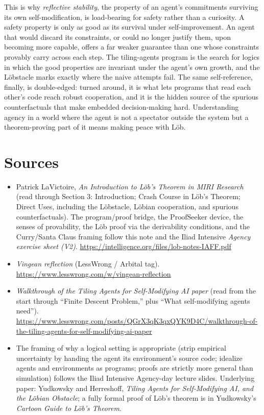 \documentclass[10pt]{article}
\theoremstyle{definition}
\theoremstyle{remark}
\newcommand{\PS}{\mathrm{ProofSeeker}}
\begin{document}
This is why \emph{reflective stability}, the property of an agent's commitments surviving its own self-modification, is load-bearing for safety rather than a curiosity. A safety property is only as good as its survival under self-improvement. An agent that would discard its constraints, or could no longer justify them, upon becoming more capable, offers a far weaker guarantee than one whose constraints provably carry across each step. The tiling-agents program is the search for logics in which the good properties are invariant under the agent's own growth, and the L\"obstacle marks exactly where the naive attempts fail. The same self-reference, finally, is double-edged: turned around, it is what lets programs that read each other's code reach robust cooperation, and it is the hidden source of the spurious counterfactuals that make embedded decision-making hard. Understanding agency in a world where the agent is not a spectator outside the system but a theorem-proving part of it means making peace with L\"ob.

\section*{Sources}

\begin{itemize}[leftmargin=1.5em]
\item Patrick LaVictoire, \emph{An Introduction to L\"ob's Theorem in MIRI Research} (read through Section 3: Introduction; Crash Course in L\"ob's Theorem; Direct Uses, including the L\"obstacle, L\"obian cooperation, and spurious counterfactuals). The program/proof bridge, the $\PS$ device, the senses of provability, the L\"ob proof via the derivability conditions, and the Curry/Santa Claus framing follow this note and the Iliad Intensive \emph{Agency exercise sheet (V2)}. \url{https://intelligence.org/files/lob-notes-IAFF.pdf}
\item \emph{Vingean reflection} (LessWrong / Arbital tag). \url{https://www.lesswrong.com/w/vingean-reflection}
\item \emph{Walkthrough of the Tiling Agents for Self-Modifying AI paper} (read from the start through ``Finite Descent Problem,'' plus ``What self-modifying agents need''). \url{https://www.lesswrong.com/posts/QGrX3qK3qxQYK9D4C/walkthrough-of-the-tiling-agents-for-self-modifying-ai-paper}
\item The framing of why a logical setting is appropriate (strip empirical uncertainty by handing the agent its environment's source code; idealize agents and environments as programs; proofs are strictly more general than simulation) follows the Iliad Intensive Agency-day lecture slides. Underlying paper: Yudkowsky and Herreshoff, \emph{Tiling Agents for Self-Modifying AI, and the L\"obian Obstacle}; a fully formal proof of L\"ob's theorem is in Yudkowsky's \emph{Cartoon Guide to L\"ob's Theorem}.
\end{itemize}
\end{document}
